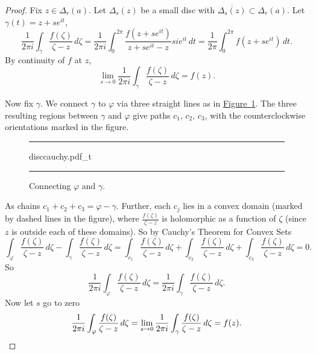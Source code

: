 \documentclass[12pt,openany]{book}
\theoremstyle{plain}
\theoremstyle{remark}
\theoremstyle{definition}
\newenvironment{myfig}{%
\begin{figure}[h!t]
\noindent\rule{\textwidth}{0.4pt}\vspace{12pt}\par\centering}%
{\par\noindent\rule{\textwidth}{0.4pt}
\end{figure}}
\theoremstyle{exercise}
\theoremstyle{example}
\newcommand{\figureref}[1]{\hyperref[#1]{Figure~\ref*{#1}}}
\begin{document}
\begin{proof}
Fix $z \in \Delta_r(a)$.
Let $\Delta_s(z)$ be a small disc with $\overline{\Delta_s(z)} \subset
\Delta_r(a)$.
Let $\gamma(t) = z+s e^{i t}$,
\begin{equation*}
\frac{1}{2\pi i}
\int_{\gamma}
\frac{f(\zeta)}{\zeta-z}
\,
d \zeta
=
\frac{1}{2\pi i}
\int_0^{2\pi} \frac{f(z+se^{it})}{z + se^{it} - z} s i e^{it} \, dt
=
\frac{1}{2\pi}
\int_0^{2\pi} f(z+se^{it}) \, dt .
\end{equation*}
By continuity of $f$ at $z$,
\begin{equation*}
\lim_{s \to 0}
\frac{1}{2\pi i}
\int_{\gamma}
\frac{f(\zeta)}{\zeta-z}
\,
d \zeta
=
f(z) .
\end{equation*}

Now fix $\gamma$.
We connect $\gamma$ to $\varphi$
via three straight lines as in \figureref{fig:disccauchy}.
The three resulting regions between $\gamma$ and $\varphi$
give paths $c_1$, $c_2$, $c_3$, with the counterclockwise
orientations marked in the figure.
\begin{myfig}
{disccauchy.pdf_t}
\caption{Connecting $\varphi$ and $\gamma$.%
\label{fig:disccauchy}}
\end{myfig}

As chains $c_1+c_2+c_3 = \varphi - \gamma$.  Further, each
$c_j$ lies in a convex domain (marked by dashed lines in the figure),
where $\frac{f(\zeta)}{\zeta-z}$ is holomorphic
as a function of $\zeta$ (since $z$ is outside each of these domains).
So by Cauchy's Theorem for Convex Sets
\begin{equation*}
\int_{\varphi} \frac{f(\zeta)}{\zeta-z} \, d\zeta -
\int_{\gamma} \frac{f(\zeta)}{\zeta-z} \, d\zeta =
\int_{c_1} \frac{f(\zeta)}{\zeta-z} \, d\zeta + 
\int_{c_2} \frac{f(\zeta)}{\zeta-z} \, d\zeta + 
\int_{c_3} \frac{f(\zeta)}{\zeta-z} \, d\zeta = 0 .
\end{equation*}
So
\begin{equation*}
\frac{1}{2\pi i}
\int_{\varphi} \frac{f(\zeta)}{\zeta-z} \, d\zeta =
\frac{1}{2\pi i}
\int_{\gamma} \frac{f(\zeta)}{\zeta-z} \, d\zeta .
\end{equation*}
Now let $s$ go to zero
\begin{equation*}
\frac{1}{2\pi i}
\int_{\varphi} \frac{f(\zeta)}{\zeta-z} \, d\zeta =
\lim_{s \to 0}
\frac{1}{2\pi i}
\int_{\gamma} \frac{f(\zeta)}{\zeta-z} \, d\zeta 
= f(z) .  \qedhere
\end{equation*}
\end{proof}
\end{document}
